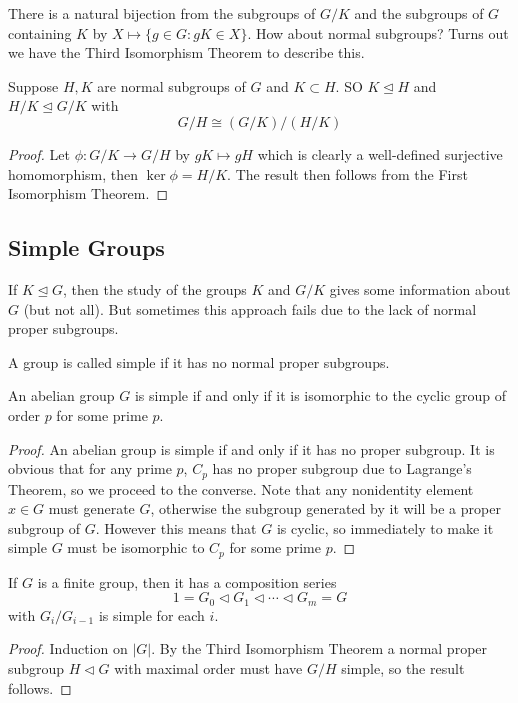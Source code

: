 \begin{remark}
    There is a natural bijection from the subgroups of $G/K$ and the subgroups of $G$ containing $K$ by $X\mapsto \{g\in G:gK\in X\}$.
    How about normal subgroups?
    Turns out we have the Third Isomorphism Theorem to describe this.
\end{remark}
\begin{corollary}
    Suppose $H,K$ are normal subgroups of $G$ and $K\subset H$.
    SO $K\unlhd H$ and $H/K\unlhd G/K$ with
    $$G/H\cong (G/K)/(H/K)$$
\end{corollary}
\begin{proof}
    Let $\phi:G/K\to G/H$ by $gK\mapsto gH$ which is clearly a well-defined surjective homomorphism, then $\ker\phi=H/K$.
    The result then follows from the First Isomorphism Theorem.
\end{proof}
\subsection{Simple Groups}
If $K\unlhd G$, then the study of the groups $K$ and $G/K$ gives some information about $G$ (but not all).
But sometimes this approach fails due to the lack of normal proper subgroups.
\begin{definition}
    A group is called simple if it has no normal proper subgroups.
\end{definition}
\begin{lemma}
    An abelian group $G$ is simple if and only if it is isomorphic to the cyclic group of order $p$ for some prime $p$.
\end{lemma}
\begin{proof}
    An abelian group is simple if and only if it has no proper subgroup.
    It is obvious that for any prime $p$, $C_p$ has no proper subgroup due to Lagrange's Theorem, so we proceed to the converse.
    Note that any nonidentity element $x\in G$ must generate $G$, otherwise the subgroup generated by it will be a proper subgroup of $G$.
    However this means that $G$ is cyclic, so immediately to make it simple $G$ must be isomorphic to $C_p$ for some prime $p$.
\end{proof}
\begin{lemma}
    If $G$ is a finite group, then it has a composition series
    $$1=G_0\lhd G_1\lhd\cdots\lhd G_m=G$$
    with $G_{i}/G_{i-1}$ is simple for each $i$.
\end{lemma}
\begin{proof}
    Induction on $|G|$.
    By the Third Isomorphism Theorem a normal proper subgroup $H\lhd G$ with maximal order must have $G/H$ simple, so the result follows.
\end{proof}